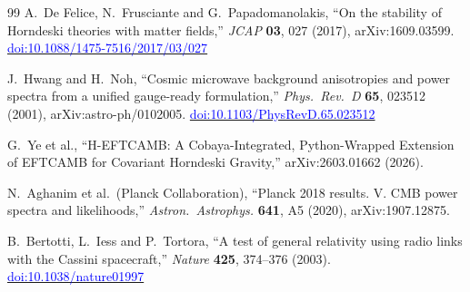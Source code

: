 \documentclass[11pt,a4paper]{article}
\newcommand{\doi}[1]{\href{https://doi.org/#1}{\textcolor{blue}{doi:#1}}}
\begin{document}
\begin{thebibliography}{99}
A.~De Felice, N.~Frusciante and G.~Papadomanolakis,
``On the stability of Horndeski theories with matter fields,''
\emph{JCAP} \textbf{03}, 027 (2017), arXiv:1609.03599.
\doi{10.1088/1475-7516/2017/03/027}

J.~Hwang and H.~Noh,
``Cosmic microwave background anisotropies and power spectra from a unified
gauge-ready formulation,''
\emph{Phys.\ Rev.\ D} \textbf{65}, 023512 (2001), arXiv:astro-ph/0102005.
\doi{10.1103/PhysRevD.65.023512}

G.~Ye et al.,
``H-EFTCAMB: A Cobaya-Integrated, Python-Wrapped Extension of EFTCAMB for
Covariant Horndeski Gravity,'' arXiv:2603.01662 (2026).

N.~Aghanim et al.\ (Planck Collaboration),
``Planck 2018 results. V. CMB power spectra and likelihoods,''
\emph{Astron.\ Astrophys.} \textbf{641}, A5 (2020),
arXiv:1907.12875.

B.~Bertotti, L.~Iess and P.~Tortora,
``A test of general relativity using radio links with the Cassini spacecraft,''
\emph{Nature} \textbf{425}, 374--376 (2003).
\doi{10.1038/nature01997}




\end{thebibliography}
\end{document}
